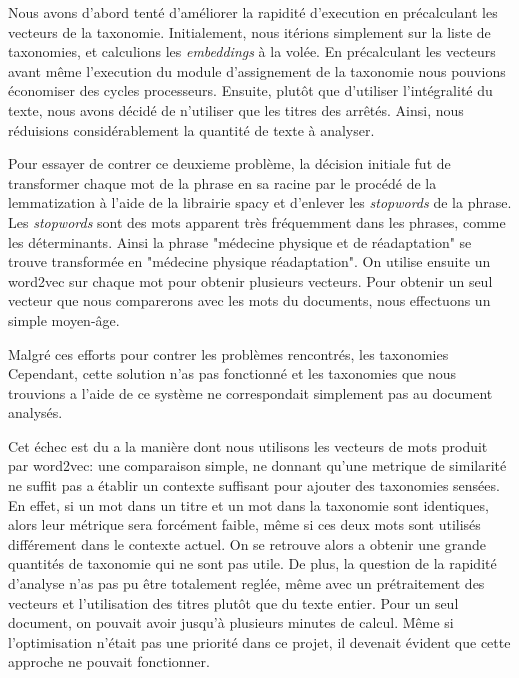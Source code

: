 Nous avons d'abord tenté d'améliorer la rapidité d'execution en précalculant les vecteurs de la taxonomie. Initialement, nous itérions simplement sur la liste de taxonomies, et calculions les \textit{embeddings} à la volée. En précalculant les vecteurs avant même l'execution du module d'assignement de la taxonomie nous pouvions économiser des cycles processeurs. Ensuite, plutôt que d'utiliser l'intégralité du texte, nous avons décidé de n'utiliser que les titres des arrêtés. Ainsi, nous réduisions considérablement la quantité de texte à analyser.

Pour essayer de contrer ce deuxieme problème, la décision initiale fut de transformer chaque mot de la phrase en sa racine par le procédé de la lemmatization à l'aide de la librairie spacy\cite{spacy} et d'enlever les \textit{stopwords} de la phrase.
Les \textit{stopwords} sont des mots apparent très fréquemment dans les phrases, comme les déterminants.
Ainsi la phrase "médecine physique et de réadaptation" se trouve transformée en "médecine physique réadaptation".
On utilise ensuite un word2vec sur chaque mot pour obtenir plusieurs vecteurs. Pour obtenir un seul vecteur que nous comparerons avec les mots du documents, nous effectuons un simple moyen-âge.

Malgré ces efforts pour contrer les problèmes rencontrés, les taxonomies
Cependant, cette solution n'as pas fonctionné et les taxonomies que nous trouvions a l'aide de ce système ne correspondait simplement pas au document analysés.

Cet échec est du a la manière dont nous utilisons les vecteurs de mots produit par word2vec: une comparaison simple, ne donnant qu'une metrique de similarité ne suffit pas a établir un contexte suffisant pour ajouter des taxonomies sensées. En effet, si un mot dans un titre et un mot dans la taxonomie sont identiques, alors leur métrique sera forcément faible, même si ces deux mots sont utilisés différement dans le contexte actuel. On se retrouve alors a obtenir une grande quantités de taxonomie qui ne sont pas utile. De plus, la question de la rapidité d'analyse n'as pas pu être totalement reglée, même avec un prétraitement des vecteurs et l'utilisation des titres plutôt que du texte entier. Pour un seul document, on pouvait avoir jusqu'à plusieurs minutes de calcul. Même si l'optimisation n'était pas une priorité dans ce projet, il devenait évident que cette approche ne pouvait fonctionner.

